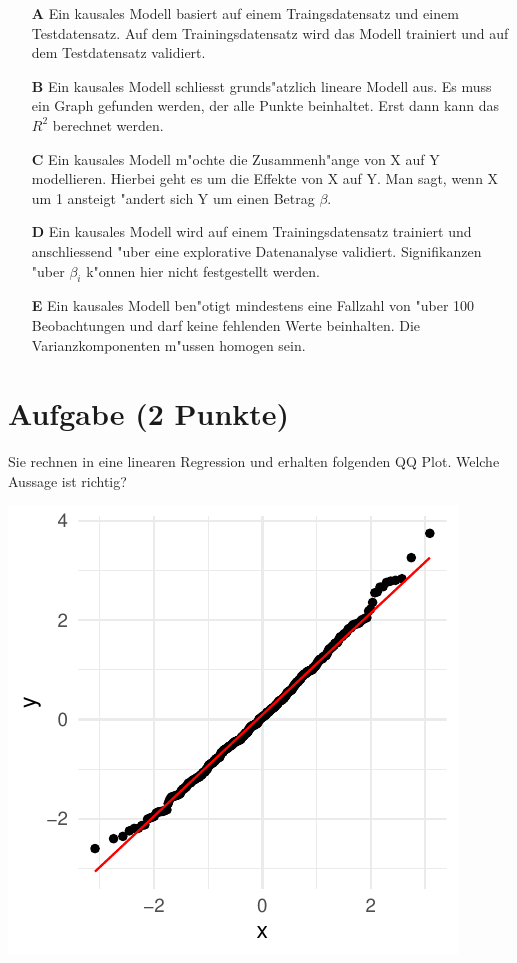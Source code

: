 \documentclass[a4paper, 9pt]{scrartcl}\usepackage[]{graphicx}\usepackage[]{xcolor}
\makeatletter
\def\maxwidth{ %
  \ifdim\Gin@nat@width>\linewidth
    \linewidth
  \else
    \Gin@nat@width
  \fi
}
\makeatother
\begin{document}
\begin{enumerate}
\item [\textbf{A} \msquare] Ein kausales Modell basiert auf einem Traingsdatensatz und einem Testdatensatz. Auf dem Trainingsdatensatz wird das Modell trainiert und auf dem Testdatensatz validiert.
\item [\textbf{B} \msquare] Ein kausales Modell schliesst grunds{"a}tzlich lineare Modell aus. Es muss ein Graph gefunden werden, der alle Punkte beinhaltet. Erst dann kann das $R^2$ berechnet werden.
\item [\textbf{C} \msquare] Ein kausales Modell m{"o}chte die Zusammenh{"a}nge von X auf Y modellieren. Hierbei geht es um die Effekte von X auf Y. Man sagt, wenn X um 1 ansteigt {"a}ndert sich Y um einen Betrag $\beta$.
\item [\textbf{D} \msquare] Ein kausales Modell wird auf einem Trainingsdatensatz trainiert und anschliessend {"u}ber eine explorative Datenanalyse validiert. Signifikanzen {"u}ber $\beta_i$ k{"o}nnen hier nicht festgestellt werden.
\item [\textbf{E} \msquare] Ein kausales Modell ben{"o}tigt mindestens eine Fallzahl von {"u}ber 100 Beobachtungen und darf keine fehlenden Werte beinhalten. Die Varianzkomponenten m{"u}ssen homogen sein.
\end{enumerate}

\section{Aufgabe \hfill (2 Punkte)}

Sie rechnen in eine linearen Regression und erhalten folgenden QQ
Plot. Welche Aussage ist richtig?




{\centering \includegraphics[width=\maxwidth]{img/mc-regression-05-a-1} 

}
\end{document}
